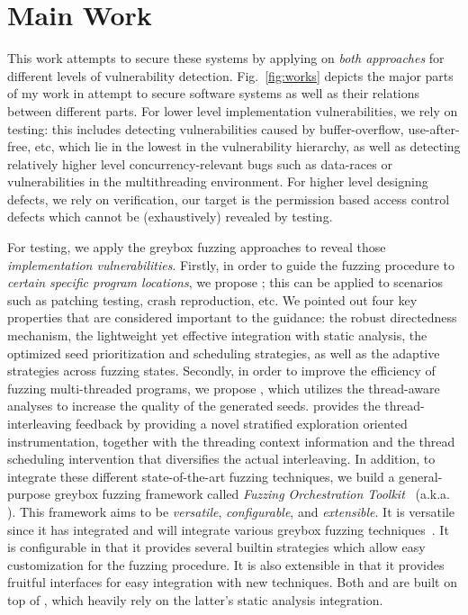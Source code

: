 \section{Main Work}

This work attempts to secure these systems by applying on \emph{both approaches} for different levels of vulnerability detection.  Fig.~\ref{fig:works} depicts the major parts of my work in attempt to secure software systems as well as their relations between different parts. For lower level implementation vulnerabilities, we rely on testing: this includes detecting vulnerabilities caused by buffer-overflow, use-after-free, etc, which lie in the lowest in the vulnerability hierarchy, as well as detecting relatively higher level concurrency-relevant bugs such as data-races or vulnerabilities in the multithreading environment. For higher level designing defects, we rely on verification, our target is the permission based access control defects which cannot be (exhaustively) revealed by testing.

For testing, we apply the greybox fuzzing approaches to reveal those \emph{implementation vulnerabilities}.
Firstly, in order to guide the fuzzing procedure to \emph{certain specific program locations}, we propose \dFOT; this can be applied to scenarios such as patching testing, crash reproduction, etc. We pointed out four key properties that are considered important to the guidance: the robust directedness mechanism, the lightweight yet effective integration with static analysis, the optimized seed prioritization and scheduling strategies, as well as the adaptive strategies across fuzzing states. 
Secondly, in order to improve the efficiency of fuzzing multi-threaded programs, we propose \mtfuzz, which utilizes the thread-aware analyses to increase the quality of the generated seeds. \mtfuzz provides the thread-interleaving feedback by providing a novel stratified exploration oriented instrumentation, together with the threading context information and the thread scheduling intervention that diversifies the actual interleaving.
In addition, to integrate these different state-of-the-art fuzzing techniques, we build a general-purpose greybox fuzzing framework called \emph{Fuzzing Orchestration Toolkit}~\cite{fse18-fot} (a.k.a. \FOT). This framework aims to be \emph{versatile}, \emph{configurable}, and \emph{extensible}. It is versatile since it has integrated and will integrate various greybox fuzzing techniques~\cite{Bohme:2016:CGF,Bohme:2017:DGF,redqueen,CollAFL,Angora,fuzz_survey}. It is configurable in that it provides several builtin strategies which allow easy customization for the fuzzing procedure. It is also extensible in that it provides fruitful interfaces for easy integration with new techniques. Both \dFOT and \mtfuzz are built on top of \FOT, which heavily rely on the latter's static analysis integration.

